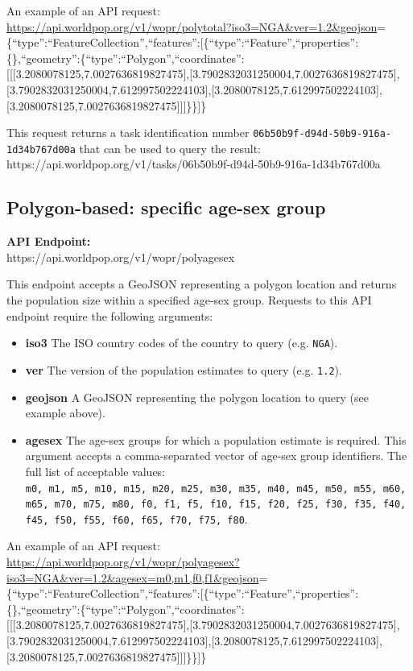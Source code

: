 \documentclass[]{book}
\begin{document}
An example of an API request:\\
\url{https://api.worldpop.org/v1/wopr/polytotal?iso3=NGA\&ver=1.2\&geojson}=\{``type'':``FeatureCollection'',``features'':{[}\{``type'':``Feature'',``properties'':\{\},``geometry'':\{``type'':``Polygon'',``coordinates'':{[}{[}{[}3.2080078125,7.0027636819827475{]},{[}3.7902832031250004,7.0027636819827475{]},{[}3.7902832031250004,7.612997502224103{]},{[}3.2080078125,7.612997502224103{]},{[}3.2080078125,7.0027636819827475{]}{]}{]}\}\}{]}\}

This request returns a task identification number
\texttt{06b50b9f-d94d-50b9-916a-1d34b767d00a} that can be used to query
the result:\\
https://api.worldpop.org/v1/tasks/06b50b9f-d94d-50b9-916a-1d34b767d00a

\subsection{Polygon-based: specific age-sex
group}\label{polygon-based-specific-age-sex-group}

\textbf{API Endpoint:}\\
https://api.worldpop.org/v1/wopr/polyagesex

This endpoint accepts a GeoJSON representing a polygon location and
returns the population size within a specified age-sex group. Requests
to this API endpoint require the following arguments:

\begin{itemize}
\item
  \textbf{iso3} The ISO country codes of the country to query (e.g.
  \texttt{NGA}).
\item
  \textbf{ver} The version of the population estimates to query (e.g.
  \texttt{1.2}).
\item
  \textbf{geojson} A GeoJSON representing the polygon location to query
  (see example above).
\item
  \textbf{agesex} The age-sex groups for which a population estimate is
  required. This argument accepts a comma-separated vector of age-sex
  group identifiers. The full list of acceptable values:
  \texttt{m0,\ m1,\ m5,\ m10,\ m15,\ m20,\ m25,\ m30,\ m35,\ m40,\ m45,\ m50,\ m55,\ m60,\ m65,\ m70,\ m75,\ m80,\ f0,\ f1,\ f5,\ f10,\ f15,\ f20,\ f25,\ f30,\ f35,\ f40,\ f45,\ f50,\ f55,\ f60,\ f65,\ f70,\ f75,\ f80}.
\end{itemize}

An example of an API request:\\
\url{https://api.worldpop.org/v1/wopr/polyagesex?iso3=NGA\&ver=1.2\&agesex=m0,m1,f0,f1\&geojson}=\{``type'':``FeatureCollection'',``features'':{[}\{``type'':``Feature'',``properties'':\{\},``geometry'':\{``type'':``Polygon'',``coordinates'':{[}{[}{[}3.2080078125,7.0027636819827475{]},{[}3.7902832031250004,7.0027636819827475{]},{[}3.7902832031250004,7.612997502224103{]},{[}3.2080078125,7.612997502224103{]},{[}3.2080078125,7.0027636819827475{]}{]}{]}\}\}{]}\}
\end{document}
